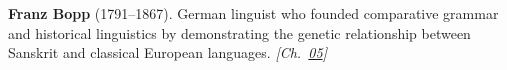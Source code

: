 \textbf{Franz Bopp} (1791–1867). German linguist who founded comparative grammar and historical linguistics by demonstrating the genetic relationship between Sanskrit and classical European languages. \emph{[Ch.~\hyperref[ch:circlewheel]{05}]}

